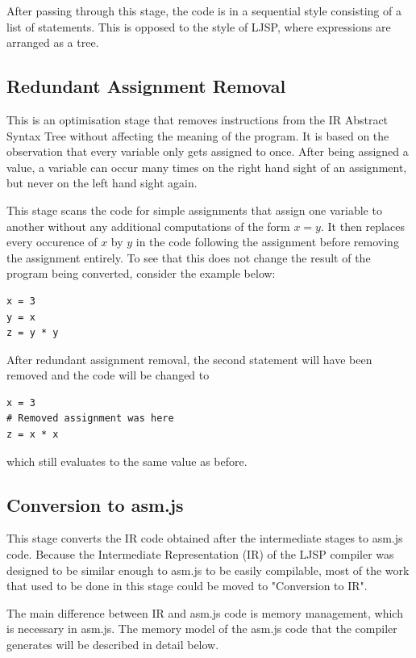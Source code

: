 \documentclass[11pt]{report}
\begin{document}
After passing through this stage, the code is in a sequential style consisting of a list of statements. This is opposed to the style of LJSP, where expressions are arranged as a tree.


\subsection{Redundant Assignment Removal}
This is an optimisation stage that removes instructions from the IR Abstract Syntax Tree without affecting the meaning of the program. It is based on the observation that every variable only gets assigned to once. After being assigned a value, a variable can occur many times on the right hand sight of an assignment, but never on the left hand sight again.

This stage scans the code for simple assignments that assign one variable to another without any additional computations of the form $x = y$. It then replaces every occurence of $x$ by $y$ in the code following the assignment before removing the assignment entirely. To see that this does not change the result of the program being converted, consider the example below:
\begin{lstlisting}
x = 3
y = x
z = y * y
\end{lstlisting}

After redundant assignment removal, the second statement will have been removed and the code will be changed to
\begin{lstlisting}
x = 3
# Removed assignment was here
z = x * x
\end{lstlisting}
which still evaluates to the same value as before.

\subsection{Conversion to asm.js}
This stage converts the IR code obtained after the intermediate stages to asm.js code. Because the Intermediate Representation (IR) of the LJSP compiler was designed to be similar enough to asm.js to be easily compilable, most of the work that used to be done in this stage could be moved to "Conversion to IR".

The main difference between IR and asm.js code is memory management, which is necessary in asm.js. The memory model of the asm.js code that the compiler generates will be described in detail below.
\end{document}
